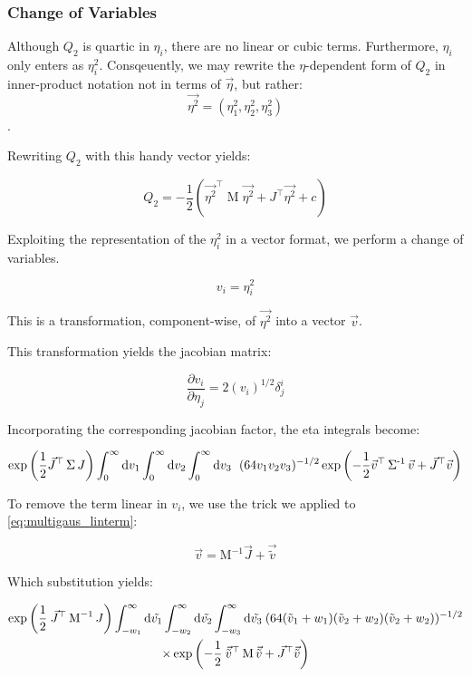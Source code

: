 \documentclass[10pt,letterpaper]{article}
\def\d{{\rm d}}  %
\begin{document}
\subsubsection{Change of Variables}

Although $Q_2$ is quartic in $\eta_i$, there are no linear or cubic terms. Furthermore, $\eta_i$ only enters as $\eta_i^2$. Consqeuently, we may rewrite the $\eta$-dependent form of $Q_2$ in inner-product notation not in terms of $\vec{\eta}$, but rather:
$$\vec{\eta^2} = (\eta_1^2,\eta_2^2,\eta_3^2)$$.

Rewriting $Q_2$ with this handy vector yields:

\begin{equation} \label{eq:eta_squared}
Q_2 = -\frac{1}{2} \left(\vec{\eta^2}^\top \operatorname{M} \vec{\eta^2} + J^\top \vec{\eta^2} + c \right)
\end{equation}

Exploiting the representation of the $\eta_i^2$ in a vector format, we perform a change of variables.

$$v_i = \eta_i^2$$

This is a transformation, component-wise, of $\vec{\eta^2}$ into a vector $\vec{v}$.

This transformation yields the jacobian matrix:

\begin{equation}
\frac{\partial v_i}{\partial \eta_j} = 2(v_i)^{1/2} \delta^{i}_{j}
\end{equation}

Incorporating the corresponding jacobian factor, the eta integrals become:

\begin{equation} \label{eq:eta_lintrick}
\exp\left(\frac{1}{2}\vec{J}^\top \operatorname{\Sigma} J\right) \int_0^{\infty} \d v_1 \int_0^{\infty} \d v_2 \int_0^{\infty} \d v_3 \hspace{0.5pc}  (64 v_1 v_2 v_3)^{-1/2} \exp\left(-\frac{1}{2} \vec{v}^\top \operatorname{\Sigma^{-1}} \vec{v} + \vec{J}^\top \vec{v}\right)
\end{equation}

To remove the term linear in $v_i$, we use the trick we applied to \ref{eq:multigaus_linterm}:

$$\vec{v} = \operatorname{M^{-1}} \vec{J} + \vec{\tilde{v}}$$

Which substitution yields:

\begin{gather} 
\exp\left(\frac{1}{2} \hspace{0.2pc} \vec{J}^\top \operatorname{M}^{-1} J\right) \int_{-w_1}^{\infty} \d \tilde{v_1} \int_{-w_2}^{\infty} \d \tilde{v_2} \int_{-w_3}^{\infty} \d \tilde{v_3}   \hspace{0.2pc} (64 (\tilde{v}_1 + w_1)(\tilde{v}_2 + w_2)(\tilde{v}_2 + w_2))^{-1/2} \nonumber \\ 
\times \exp\left(-\frac{1}{2} \hspace{0.2pc} \vec{\tilde{v}}^\top 			\operatorname{M} \vec{\tilde{v}} + \vec{J}^\top \vec{\tilde{v}}\right) \\ \nonumber
\end{gather}
\end{document}
